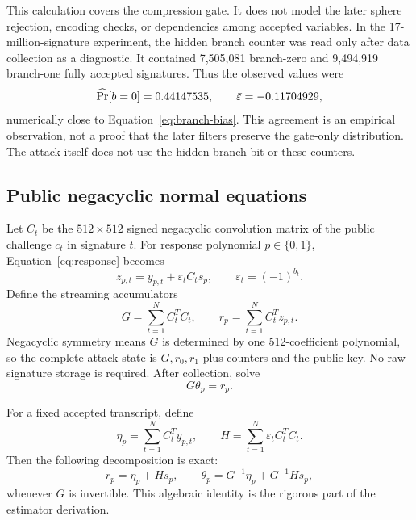 \documentclass[11pt,a4paper]{article}
\newcommand{\Prb}{\mathop{\rm Pr}}
\begin{document}
This calculation covers the compression gate.  It does not model the later
sphere rejection, encoding checks, or dependencies among accepted variables.
In the 17-million-signature experiment, the hidden branch counter was read
only after data collection as a diagnostic.  It contained 7,505,081
branch-zero and 9,494,919 branch-one fully accepted signatures.  Thus the
observed values were
\[
       \widehat{\Prb}[b=0]=0.44147535,
       \qquad \bar\varepsilon=-0.11704929,
\]
numerically close to Equation~\eqref{eq:branch-bias}.  This agreement is an
empirical observation, not a proof that the later filters preserve the
gate-only distribution.  The attack itself does not use the hidden branch bit
or these counters.

\subsection{Public negacyclic normal equations}

Let $C_t$ be the $512\times512$ signed negacyclic convolution matrix of the
public challenge $c_t$ in signature $t$.  For response polynomial $p\in
\{0,1\}$, Equation~\eqref{eq:response} becomes
\begin{equation}
              z_{p,t}=y_{p,t}+\varepsilon_t C_t s_p,
              \qquad \varepsilon_t=(-1)^{b_t}.
\label{eq:linear-response}
\end{equation}
Define the streaming accumulators
\begin{equation}
       G=\sum_{t=1}^{N} C_t^TC_t,
       \qquad
       r_p=\sum_{t=1}^{N} C_t^Tz_{p,t}.
\label{eq:normal-acc}
\end{equation}
Negacyclic symmetry means $G$ is determined by one 512-coefficient
polynomial, so the complete attack state is $G,r_0,r_1$ plus counters and the
public key.  No raw signature storage is required.  After collection, solve
\begin{equation}
                         G\theta_p=r_p.
\label{eq:normal-solve}
\end{equation}

For a fixed accepted transcript, define
\[
  \eta_p=\sum_{t=1}^{N}C_t^Ty_{p,t},
  \qquad H=\sum_{t=1}^{N}\varepsilon_t C_t^TC_t.
\]
Then the following decomposition is exact:
\begin{equation}
             r_p=\eta_p+Hs_p,
       \qquad \theta_p=G^{-1}\eta_p+G^{-1}Hs_p,
\label{eq:exact-score}
\end{equation}
whenever $G$ is invertible.  This algebraic identity is the rigorous part of
the estimator derivation.
\end{document}
